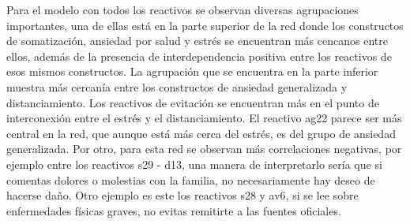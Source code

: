 \documentclass[11pt,spanish]{article}\usepackage[]{graphicx}\usepackage[]{color}
\begin{document}
Para el modelo con todos los reactivos se observan diversas agrupaciones importantes, una de ellas está en la parte superior de la red donde los constructos de somatización, ansiedad por salud y estrés se encuentran más cencanos entre ellos, además de la presencia de interdependencia positiva entre los reactivos de esos mismos constructos. La agrupación que se encuentra en la parte inferior muestra más cercanía entre los constructos de ansiedad generalizada y distanciamiento. Los reactivos de evitación se encuentran más en el punto de interconexión entre el estrés y el distanciamiento. El reactivo ag22 parece ser más central en la red, que aunque está más cerca del estrés, es del grupo de ansiedad generalizada. Por otro, para esta red se observan más correlaciones negativas, por ejemplo entre los reactivos s29 - d13, una manera de interpretarlo sería que si comentas dolores o molestias con la familia, no necesariamente hay deseo de hacerse daño. Otro ejemplo es este los reactivos s28 y av6, si se lee sobre enfermedades físicas graves, no evitas remitirte a las fuentes oficiales. 
\end{document}
